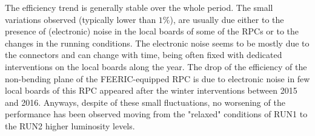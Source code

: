 The efficiency trend is generally stable over the whole period. The small variations observed (typically lower than $1\%$), are usually due either to the presence of (electronic) noise in the local boards of some of the RPCs or to the changes in the running conditions.
The electronic noise seems to be mostly due to the connectors and can change with time, being often fixed with dedicated interventions on the local boards along the year.
The drop of the efficiency of the non-bending plane of the FEERIC-equipped RPC is due to electronic noise in few local boards of this RPC appeared after the winter interventions between 2015 and 2016.
Anyways, despite of these small fluctuations, no worsening of the performance has been observed moving from the "relaxed" conditions of RUN1 to the RUN2
higher luminosity levels. 
